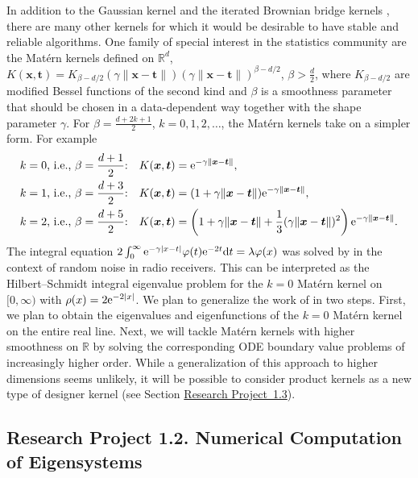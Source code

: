 \documentclass[11pt]{NSFamsart}
\def\reals{{\mathbb{R}}}
\newcommand{\bx}{{\boldsymbol{x}}}
\newcommand{\bt}{{\boldsymbol{t}}}
\newcommand{\me}{\textup{e}}
\def\dif{\textup{d}}
\newcommand{\refprobac}{\hyperref[SectDesignerKernels]{Research Project~1.3}}
\begin{document}
In addition to the Gaussian kernel \citep{FMcC12} and the iterated Brownian bridge kernels \citep{CavorettoEtAl14}, there are many other kernels for which it would be desirable to have stable and reliable algorithms. One family of special interest in the statistics community \citep{Ste99} are the Mat\'ern kernels defined on $\reals^d$, $K(\bx,\bt) = K_{\beta-d/2}\left(\gamma\|\bx-\bt\|\right) \left( \gamma \| \bx - \bt \|\right)^{\beta-d/2}$, $\beta > \frac d2$,
where $K_{\beta-d/2}$ are modified Bessel functions of the second kind and $\beta$ is a smoothness parameter that should be chosen in a data-dependent way together with the shape parameter $\gamma$. For $\beta = \frac{d + 2k+1}{2}$, $k=0,1,2,\ldots$, the Mat\'ern kernels take on a simpler form. For example
\begin{align*}
\text{$k = 0$, i.e., $\beta = \frac{d+1}{2}$:}\quad & K(\bx,\bt) = \me^{-\gamma \|\bx-\bt\|}, \\
\text{$k = 1$, i.e., $\beta = \frac{d+3}{2}$:}\quad & K(\bx,\bt) = (1+\gamma \|\bx-\bt\|)\me^{-\gamma \|\bx-\bt\|}, \\
\text{$k = 2$, i.e., $\beta = \frac{d+5}{2}$:}\quad & K(\bx,\bt) = \left(1+\gamma \|\bx-\bt\|+\frac{1}{3}(\gamma \|\bx-\bt\|)^2\right)\me^{-\gamma \|\bx-\bt\|}.
\end{align*}
The integral equation $2\int_0^\infty \me^{-\gamma|x-t|}\varphi(t)\me^{-2t} \dif t = \lambda \varphi(x)$ was solved by \citet{Juncosa45} in the context of random noise in radio receivers. This can be interpreted as the Hilbert--Schmidt integral eigenvalue problem for the $k=0$ Mat\'ern kernel on $[0,\infty)$ with $\rho(x) = 2\me^{-2|x|}$. We plan to generalize the work of \citet{Juncosa45} in two steps. First, we plan to obtain the eigenvalues and eigenfunctions of the $k=0$ Mat\'ern kernel on the entire real line. Next, we will tackle Mat\'ern kernels with higher smoothness on $\reals$ by solving the corresponding ODE boundary value problems of increasingly higher order. While a generalization of this approach to higher dimensions seems unlikely, it will be possible to consider product kernels as a new type of designer kernel (see Section \refprobac).

\subsection*{Research Project 1.2. Numerical Computation of Eigensystems} \label{NumerEigensubsec}
\end{document}
